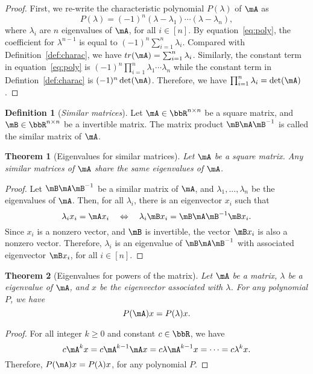 \documentclass[11pt]{article}
\theoremstyle{plain}
\newtheorem{thm}{Theorem}[section]
\theoremstyle{definition}
\newtheorem{defn}{Definition}
\begin{document}
\begin{proof}
	First, we re-write the characteristic polynomial $P(\lambda)$ of $\mA$ as
	\begin{equation}\label{eq:poly}
		P(\lambda) = (-1)^n (\lambda - \lambda_1)\cdots (\lambda - \lambda_n), 
	\end{equation}   
	where $\lambda_i$ are $n$ eigenvalues of $\mA$, for all $ i \in [n]$. By equation~\eqref{eq:poly}, the coefficient for $\lambda^{n-1}$ is equal to $(-1)^n\sum_{i=1}^n \lambda_i$. Compared with Definition~\ref{def:charac}, we have $tr(\mA) = \sum_{i=1}^n \lambda_i$. Similarly, the constant term in equation~\eqref{eq:poly} is $(-1)^n \prod_{i=1}^n \lambda_1 \cdots \lambda_n $ while the constant term in Defintion~\ref{def:charac} is $(-1)^n \det(\mA)$.  Therefore, we have $\prod_{i=1}^n \lambda_i = \det(\mA)$.
\end{proof}

\begin{defn}[\textit{Similar matrices}]\label{def:similar}
	Let $\mA \in \bbR^{n \times n}$ be a square matrix, and $\mB \in \bbR^{n \times n}$ be a invertible matrix. The matrix product $\mB \mA \mB^{-1}$ is called the similar matrix of $\mA$.
\end{defn}

\begin{thm}[Eigenvalues for similar matrices]\label{thm:similar}
	Let $\mA$ be a square matrix. Any similar matrices of $\mA$ share the same eigenvalues of $\mA$.
\end{thm}
\begin{proof}
	Let $\mB \mA \mB^{-1}$ be a similar matrix of $\mA$, and $\lambda_1,...,\lambda_n$ be the eigenvalues of $\mA$. Then, for all $\lambda_i$, there is an eigenvector $x_i$ such that
	\[ \lambda_i x_i = \mA x_i \quad \Leftrightarrow \quad \lambda_i \mB x_i = \mB \mA \mB^{-1} \mB x_i.\]
	Since $x_i$ is a nonzero vector, and $\mB$ is invertible, the vector $\mB x_i$ is also a nonzero vector. Therefore, $\lambda_i$ is an eigenvalue of $\mB \mA \mB^{-1}$ with associated eigenvector $\mB x_i$, for all $i \in [n]$.
\end{proof}

\begin{thm}[Eigenvalues for powers of the matrix]
	Let $\mA$ be a matrix, $\lambda$  be a eigenvalue of $\mA$, and $x$ be the eigenvector associated with $\lambda$. For any polynomial $P$, we have
	\[ P(\mA) x = P(\lambda) x. \]
\end{thm}
\begin{proof}
	For all integer $k \geq 0$ and constant $c \in \bbR$, we have
	\[ c\mA^k x = c\mA^{k-1} \mA x= c\lambda \mA^{k-1} x = \cdots = c\lambda^k x.\]
	Therefore, $P(\mA)x = P(\lambda)x$, for any polynomial $P$.
\end{proof}
\end{document}
